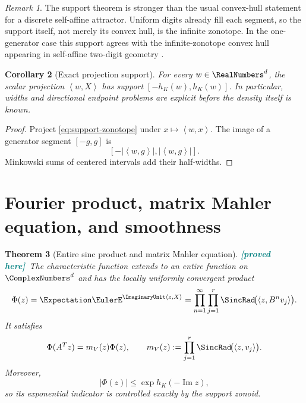 \documentclass[11pt,oneside]{article}
\newtheorem{theorem}{Theorem}[section]
\newtheorem{corollary}[theorem]{Corollary}
\theoremstyle{definition}
\theoremstyle{remark}
\newtheorem{remark}[theorem]{Remark}
\newcommand{\ip}[2]{\left\langle #1,#2\right\rangle}
\newcommand{\New}{\textcolor{teal}{\textbf{[proved here]}}}
\begin{document}
\begin{remark}
The support theorem is stronger than the usual convex-hull statement for a
discrete self-affine attractor.  Uniform digits already fill each segment, so the
support itself, not merely its convex hull, is the infinite zonotope.  In the
one-generator case this support agrees with the infinite-zonotope convex hull
appearing in self-affine two-digit geometry \cite{ProtasovZaitseva}.
\end{remark}

\begin{corollary}[Exact projection support]
\label{cor:projection-support}
For every $w\in\RealNumbers^d$, the scalar projection $\ip{w}{X}$ has support
$[-h_K(w),h_K(w)]$.  In particular, widths and directional endpoint problems
are explicit before the density itself is known.
\end{corollary}

\begin{proof}
Project \eqref{eq:support-zonotope} under $x\mapsto\ip{w}{x}$.  The image
of a generator segment $[-g,g]$ is
\[
 [-|\ip{w}{g}|,|\ip{w}{g}|].
\]
Minkowski sums of centered intervals add their half-widths.
\end{proof}

\section{Fourier product, matrix Mahler equation, and smoothness}
\label{sec:fourier}

\begin{theorem}[Entire sinc product and matrix Mahler equation]
\label{thm:mahler}
\New\ The characteristic function extends to an entire function on $\ComplexNumbers^d$ and
has the locally uniformly convergent product
\begin{equation}
 \Phi(z)=\Expectation\EulerE^{\ImaginaryUnit\ip{z}{X}}
 =\prod_{n=1}^{\infty}\prod_{j=1}^r
   \SincRad\!\bigl(\ip{z}{B^nv_j}\bigr).
 \label{eq:fourier-product}
\end{equation}
It satisfies
\begin{equation}
 \Phi(A^Tz)=m_V(z)\Phi(z),
 \qquad
 m_V(z):=\prod_{j=1}^r\SincRad\!\bigl(\ip{z}{v_j}\bigr).
 \label{eq:matrix-mahler}
\end{equation}
Moreover,
\begin{equation}
 |\Phi(z)|\le \exp h_K(-\operatorname{Im}z),
 \label{eq:exp-type}
\end{equation}
so its exponential indicator is controlled exactly by the support zonoid.
\end{theorem}
\end{document}
